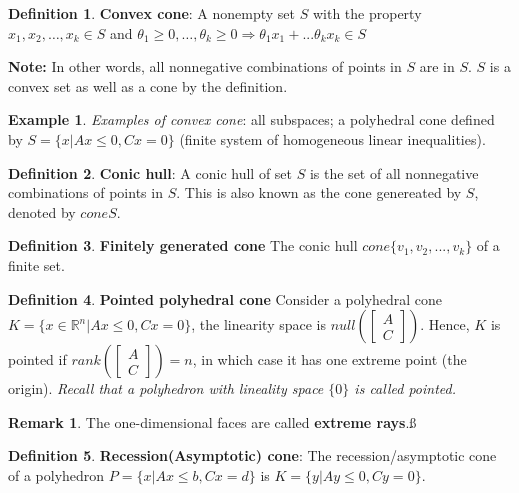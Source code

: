 \documentclass[10pt]{article}
\def\R{\mathbb{R}}
\def\imp{\Rightarrow}
\theoremstyle{definition}
\newtheorem{defn}{Definition}[section]
\newtheorem{example}{Example}[section]
\newtheorem{remark}{Remark}[section]
\newcommand{\Note}[0]{\noindent\textbf{Note: }}
\begin{document}
\begin{defn} \textbf{Convex cone}:
	A nonempty set $S$ with the property $x_1, x_2, \dots, x_k \in S$ and
	$\theta_1 \ge 0, \dots, \theta_k \ge 0 \imp \theta_1 x_1 + ...  \theta_k x_k \in S$
\end{defn}

\Note In other words, all nonnegative combinations of points in $S$ are in $S$.
$S$ is a convex set as well as a cone by the definition.

\begin{example}
	\textit{Examples of convex cone}: all subspaces; a polyhedral cone defined by $S = \{x | Ax \le 0, Cx = 0\}$
	(finite system of homogeneous linear inequalities).
\end{example}

\begin{defn} \textbf{Conic hull}:
	A conic hull of set $S$ is the set of all nonnegative combinations of points in $S$. This is also known as the cone genereated by $S$, denoted
	by $cone S$.
\end{defn}

\begin{defn} \textbf{Finitely generated cone}
	The conic hull $cone\{v_1, v_2, ..., v_k\}$ of a finite set.
\end{defn}

\begin{defn} \textbf{Pointed polyhedral cone}
	Consider a polyhedral cone $K = \{x \in \R^n | Ax \le 0, Cx = 0\}$, the linearity space is $null(\begin{bmatrix}
			A \\ C
		\end{bmatrix})$. Hence, $K$ is pointed if $rank(\begin{bmatrix}
			A \\ C
		\end{bmatrix}) = n$, in which case it has one extreme point (the origin). \textit{Recall that a polyhedron with lineality space $\{0\}$ is called pointed.}
\end{defn}

\begin{remark}
	The one-dimensional faces are called \textbf{extreme rays}.ß
\end{remark}

\begin{defn} \textbf{Recession(Asymptotic) cone}:
	The recession/asymptotic cone of a polyhedron $P = \{x|Ax \le b, Cx = d\}$ is $K = \{y | Ay \le 0, Cy = 0\}$.
\end{defn}
\end{document}
